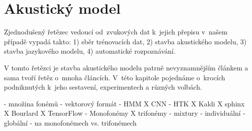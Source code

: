 \chapter{Akustický model}
\label{kap:akusticky-model}

Zjednodušený řetězec vedoucí od~zvukových dat k~jejich přepisu v~našem případě
vypadá takto:
1) sběr trénovacích dat,
2) stavba akustického modelu,
3) stavba jazykového modelu,
4) automatické rozpoznávání.

V tomto řetězci je stavba akustického modelu patrně nevyznamnějším článkem a
sama tvoří řetěz o~mnoha článcích. V~této kapitole pojednáme o~krocích
podniknutých k~jeho sestavení, experimentech a různých volbách.

- množina fonémů
- vektorový formát
- HMM X CNN
- HTK X Kaldi X sphinx X Bourlard X TensorFlow
- Monofonémy X trifonémy
- mixtury
  - individuální
  - globální
  - na monofonémech vs. trifonémech

